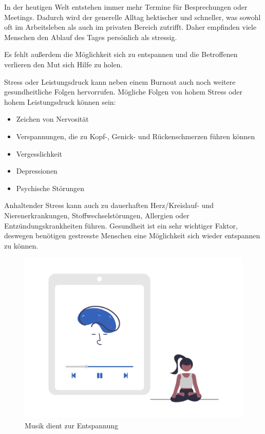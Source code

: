 
In der heutigen Welt entstehen immer mehr Termine für Besprechungen oder Meetings. 
Dadurch wird der generelle Alltag hektischer und schneller, was sowohl oft im Arbeitsleben als auch im 
privaten Bereich zutrifft. Daher empfinden viele Menschen den Ablauf des Tages persönlich als stressig.

Es fehlt außerdem die Möglichkeit sich zu entspannen und die Betroffenen verlieren den Mut sich
Hilfe zu holen.

Stress oder Leistungsdruck kann neben einem Burnout auch noch weitere gesundheitliche Folgen hervorrufen.
Mögliche Folgen von hohem Stress oder hohem Leistungsdruck können sein:

\begin{itemize}
    \item Zeichen von Nervosität
    \item Verspannungen, die zu Kopf-, Genick- und Rückenschmerzen führen können
    \item Vergesslichkeit
    \item Depressionen
    \item Psychische Störungen
\end{itemize}

Anhaltender Stress kann auch zu dauerhaften Herz/Kreislauf- und Nierenerkrankungen, Stoffwechselstörungen, 
Allergien oder Entzündungskrankheiten führen. \cite{stress} 
Gesundheit ist ein sehr wichtiger Faktor, deswegen benötigen gestresste Menschen eine Möglichkeit sich
wieder entspannen zu können.

\begin{figure}[H]
    \centering
    \includegraphics[height=0.35\textwidth]{./pics/undraw_Meditating_re_aiqa.png}
    \caption{Musik dient zur Entspannung}
\end{figure}


